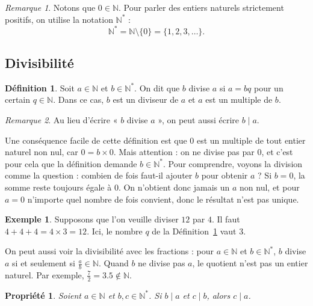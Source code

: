 \documentclass[12pt,a4paper]{article}
\theoremstyle{plain}
\newtheorem{property}[theorem]{Propriété}
\theoremstyle{definition}
\newtheorem{definition}[theorem]{Définition}
\newtheorem{example}[theorem]{Exemple}
\theoremstyle{remark}
\newtheorem*{remark}{Remarque}
\begin{document}
\begin{remark}
  Notons que $0 \in \mathbb{N}$. Pour parler des entiers naturels
  strictement positifs, on utilise la notation $\mathbb{N}^*$ :
  \[
    \mathbb{N}^* = \mathbb{N} \setminus \{0\}
    = \{1, 2, 3, \dots\}.
  \]
\end{remark}

\subsection{Divisibilité}

\begin{tcolorbox}[navybar]
\begin{definition}
  Soit $a \in \mathbb{N}$ et $b \in \mathbb{N}^*$. On dit que $b$
  divise $a$ si $a = bq$ pour un certain $q \in \mathbb{N}$. Dans ce
  cas, $b$ est un diviseur de $a$ et $a$ est un multiple de $b$.
  \label{def:division}
\end{definition}
\end{tcolorbox}

\begin{remark}
  Au lieu d'écrire « $b$ divise $a$ », on peut aussi écrire $b \mid a$.
\end{remark}

Une conséquence facile de cette définition est que $0$ est un multiple
de tout entier naturel non nul, car $0 = b \times 0$. Mais attention :
on ne divise pas par $0$, et c'est pour cela que la définition demande
$b \in \mathbb{N}^*$. Pour comprendre, voyons la division comme la
question : combien de fois faut-il ajouter $b$ pour obtenir $a$ ?
Si $b = 0$, la somme reste toujours égale à $0$. On n'obtient donc
jamais un $a$ non nul, et pour $a = 0$ n'importe quel nombre de fois
convient, donc le résultat n'est pas unique.

\begin{example}
  Supposons que l'on veuille diviser $12$ par $4$. Il faut
  $4 + 4 + 4 = 4 \times 3 = 12$.
  Ici, le nombre $q$ de la Définition~\ref{def:division} vaut $3$.
\end{example}

On peut aussi voir la divisibilité avec les fractions : pour
$a \in \mathbb{N}$ et $b \in \mathbb{N}^*$, $b$ divise $a$ si et
seulement si $\frac{a}{b} \in \mathbb{N}$. Quand $b$ ne divise pas $a$,
le quotient n'est pas un entier naturel. Par exemple,
$\frac{7}{2} = 3.5 \notin \mathbb{N}$.

\begin{tcolorbox}[graybar]
\begin{property}
  Soient $a \in \mathbb{N}$ et $b, c \in \mathbb{N}^*$. Si $b \mid a$ et $c \mid b$,
  alors $c \mid a$.
\end{property}
\end{tcolorbox}
\end{document}
